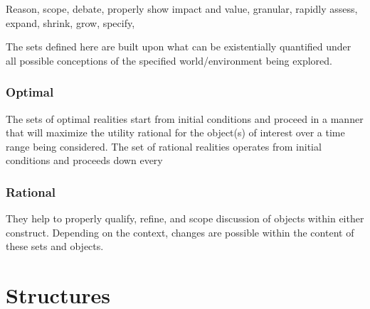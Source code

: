 \documentclass[]{article}
\begin{document}
Reason, scope, debate, properly show impact and value, granular, rapidly assess, expand, shrink, grow, specify, 

The sets defined here are built upon what can be existentially quantified under all possible conceptions of the specified world/environment being explored. 


%
\subsubsection*{Optimal}
 The sets of optimal realities start from initial conditions and proceed in a manner that will maximize the utility rational for the object(s) of interest over a time range being considered. The set of rational realities operates from initial conditions and proceeds down every
%
\subsubsection*{Rational}
They help to properly qualify, refine, and scope discussion of objects within either construct. Depending on the context, changes are possible within the content of these sets and objects.


\section*{Structures}
\end{document}
